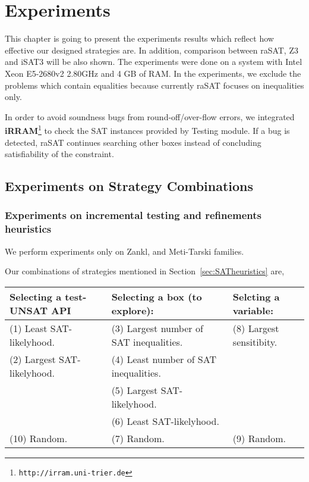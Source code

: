\chapter{Experiments} \label{chap:experiments}
This chapter is going to present the experiments results which reflect how effective our designed strategies are. In addition, comparison between raSAT, Z3 and iSAT3 will be also shown. The experiments were done on a system with  Intel Xeon E5-2680v2 2.80GHz and 4 GB of RAM. In the experiments, we exclude the problems which contain equalities because currently raSAT focuses on inequalities only.

In order to avoid soundness bugs from round-off/over-flow errors, we integrated {\bf iRRAM}\footnote{%
\tt http://irram.uni-trier.de} to check the SAT instances provided by Testing module. If a bug is detected, raSAT continues searching other boxes instead of concluding satisfiability of the constraint.
\section{Experiments on Strategy Combinations} \label{sec:expstrategy}
\subsection*{Experiments on incremental testing and refinements heuristics}
We perform experiments only on Zankl, and Meti-Tarski families. 


Our combinations of strategies mentioned in Section~\ref{sec:SATheuristics} are, 

\medskip
{\centering
\begin{tabular}{l|l|l}
Selecting a test-UNSAT API~~ & Selecting a box (to explore): & 
Selcting a variable: \\  %
\hline

(1) Least SAT-likelyhood. & 
(3) Largest number of SAT inequalities.~~ & 
(8) Largest sensitibity. \\

(2) Largest SAT-likelyhood. & 
(4) Least number of SAT inequalities. & \\

& (5) Largest SAT-likelyhood. & \\

& (6) Least SAT-likelyhood. & \\

(10) Random. & (7) Random. & (9) Random. \\
\end{tabular}
}
\medskip

